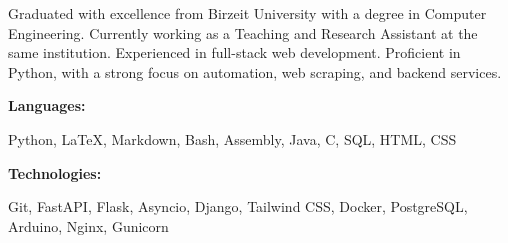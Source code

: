 \documentclass[9pt]{developercv} %
\begin{document}
\begin{minipage}[t]{0.46\textwidth}
    Graduated with excellence from Birzeit University with a degree in Computer Engineering. Currently working as a Teaching and Research Assistant at the same institution. Experienced in full-stack web development. Proficient in Python, with a strong focus on automation, web scraping, and backend services.
\end{minipage}
\hfill %
\begin{minipage}[t]{0.465\textwidth}
    \vspace{-6pt}
    
    \begin{minipage}[t]{0.2\textwidth}
        \textbf{Languages:}
    \end{minipage}
    \hfill
    \begin{minipage}[t]{0.73\textwidth}
        Python, LaTeX, Markdown, Bash, Assembly, Java, C, SQL, HTML, CSS
    \end{minipage}
    \vspace{4mm}
    
    \begin{minipage}[t]{0.2\textwidth}
        \textbf{Technologies:}
    \end{minipage}
    \hfill
    \begin{minipage}[t]{0.73\textwidth}
        Git, FastAPI, Flask, Asyncio, Django, Tailwind CSS, Docker, PostgreSQL, Arduino, Nginx, Gunicorn
    \end{minipage}
    
    
\end{minipage}
\end{document}
